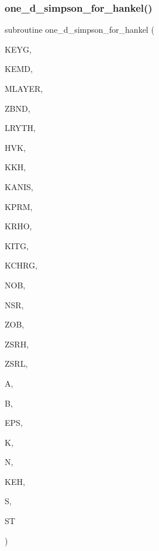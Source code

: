 \subsubsection{\texorpdfstring{one\+\_\+d\+\_\+simpson\+\_\+for\+\_\+hankel()}{one\_d\_simpson\_for\_hankel()}}
{\footnotesize\ttfamily subroutine one\+\_\+d\+\_\+simpson\+\_\+for\+\_\+hankel (\begin{DoxyParamCaption}\item[{integer, intent(in)}]{K\+E\+YG,  }\item[{integer, intent(in)}]{K\+E\+MD,  }\item[{integer, intent(in)}]{M\+L\+A\+Y\+ER,  }\item[{real, dimension(0\+:mlayer), intent(in)}]{Z\+B\+ND,  }\item[{real, dimension(mlayer), intent(in)}]{L\+R\+Y\+TH,  }\item[{real, dimension(0\+:mlayer), intent(in)}]{H\+VK,  }\item[{complex, dimension(0\+:mlayer), intent(in)}]{K\+KH,  }\item[{integer, intent(in)}]{K\+A\+N\+IS,  }\item[{integer, intent(in)}]{K\+P\+RM,  }\item[{integer, intent(in)}]{K\+R\+HO,  }\item[{integer, intent(in)}]{K\+I\+TG,  }\item[{integer, intent(in)}]{K\+C\+H\+RG,  }\item[{integer, intent(in)}]{N\+OB,  }\item[{integer, intent(in)}]{N\+SR,  }\item[{real, intent(in)}]{Z\+OB,  }\item[{real, intent(in)}]{Z\+S\+RH,  }\item[{real, intent(in)}]{Z\+S\+RL,  }\item[{real, intent(in)}]{A,  }\item[{real, intent(in)}]{B,  }\item[{real, intent(in)}]{E\+PS,  }\item[{integer}]{K,  }\item[{integer, intent(out)}]{N,  }\item[{integer, intent(in)}]{K\+EH,  }\item[{complex, dimension(4), intent(out)}]{S,  }\item[{complex, dimension(3), intent(in)}]{ST }\end{DoxyParamCaption})}

